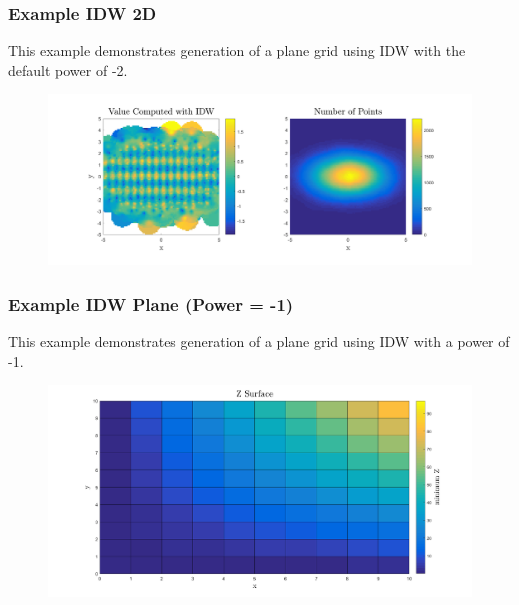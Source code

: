 \documentclass{article}
\begin{document}
\subsubsection*{Example IDW 2D}
This example demonstrates generation of a plane grid using IDW with the default power of -2.


\begin{figure}[H]
	\centering
	\includegraphics[width = \linewidth]{example3d}
\end{figure}
\clearpage

\subsubsection*{Example IDW Plane (Power = -1)}
This example demonstrates generation of a plane grid using IDW with a power of -1.


\begin{figure}[H]
	\centering
	\includegraphics[width = \linewidth]{2d}
\end{figure}
\clearpage
\end{document}
